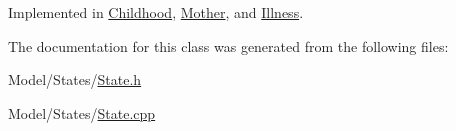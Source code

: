Implemented in \hyperlink{class_childhood_af7cb046d34104c1f8eabf20f2c35321e}{Childhood}, \hyperlink{class_mother_a47c6ce820d67f3dc4d40ac39c495ef62}{Mother}, and \hyperlink{class_illness_a912faaaf9f062c74bf9daeddc0c14e03}{Illness}.



The documentation for this class was generated from the following files\+:\begin{DoxyCompactItemize}
\item 
Model/\+States/\hyperlink{_state_8h}{State.\+h}\item 
Model/\+States/\hyperlink{_state_8cpp}{State.\+cpp}\end{DoxyCompactItemize}
